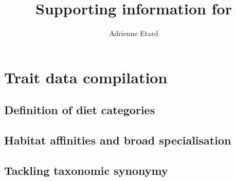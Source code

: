 \documentclass[11pt]{article}
\begin{document}
\title{Supporting information for }
\author{Adrienne Etard}

\maketitle

\clearpage
\tableofcontents


\clearpage
\listoftables

\clearpage
\listoffigures


\clearpage

\section{Trait data compilation}

\subsection{Definition of diet categories}

\subsection{Habitat affinities and broad specialisation}

\subsection{Tackling taxonomic synonymy}


\end{document}
